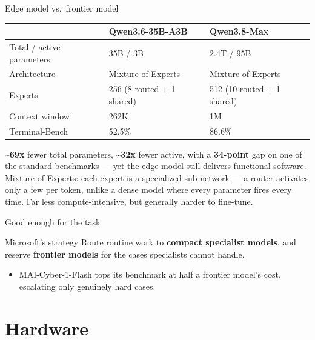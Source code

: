 \documentclass[aspectratio=169,10pt]{beamer}
\begin{document}
\begin{frame}{Edge model vs.\ frontier model}
  \footnotesize
  \renewcommand{\arraystretch}{1.08}
  \begin{center}
  \begin{tabular}{l l l}
    \toprule
    & \textbf{Qwen3.6-35B-A3B} & \textbf{Qwen3.8-Max} \\
    \midrule
    Total / active parameters & 35B / 3B & 2.4T / 95B \\
    Architecture & Mixture-of-Experts & Mixture-of-Experts \\
    Experts & 256 (8 routed + 1 shared) & 512 (10 routed + 1 shared) \\
    Context window & 262K & 1M \\
    \midrule
    Terminal-Bench & 52.5\% & 86.6\% \\
    \bottomrule
  \end{tabular}
  \end{center}
  \vspace{0.5em}
  \textbf{\textcolor{accent}{\textasciitilde{}69x}} fewer total parameters,
  \textbf{\textcolor{accent}{\textasciitilde{}32x}} fewer active, with a
  \textbf{34-point} gap on one of the standard benchmarks --- yet the edge
  model still delivers functional software.
  \vspace{0.4em}\\
  \color{muted} Mixture-of-Experts: each expert is a specialized
  sub-network --- a router activates only a few per token, unlike a dense
  model where every parameter fires every time. Far less
  compute-intensive, but generally harder to fine-tune.
\end{frame}

\begin{frame}{Good enough for the task}
  \begin{block}{Microsoft's strategy}
    \small Route routine work to \textbf{compact specialist models}, and
    reserve \textbf{frontier models} for the cases specialists cannot
    handle.
  \end{block}
  \vspace{0.5em}
  \begin{itemize}
    \item MAI-Cyber-1-Flash tops its benchmark at half a frontier model's
      cost, escalating only genuinely hard cases.
  \end{itemize}
\end{frame}

\section{Hardware}
\end{document}
